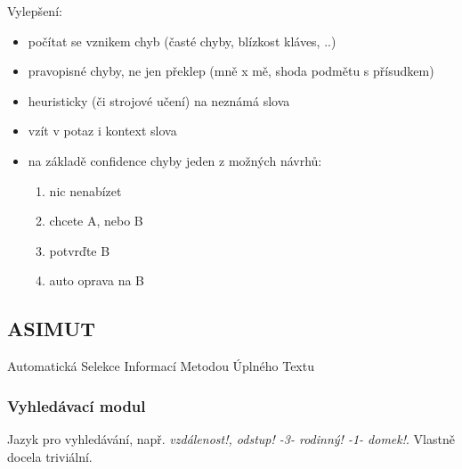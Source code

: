 \documentclass[a4paper]{article}
\begin{document}
Vylepšení:
\begin{itemize}
\item počítat se vznikem chyb (časté chyby, blízkost kláves, ..)
\item pravopisné chyby, ne jen překlep (mně x mě, shoda podmětu s přísudkem)
\item heuristicky (či strojové učení) na neznámá slova
\item vzít v potaz i kontext slova
\item na základě confidence chyby jeden z možných návrhů:
\begin{enumerate}
	\item nic nenabízet
	\item chcete A, nebo B
	\item potvrďte B
	\item auto oprava na B
\end{enumerate}
\end{itemize}

\subsection*{ASIMUT}
Automatická Selekce Informací Metodou Úplného Textu

\subsubsection*{Vyhledávací modul} 
Jazyk pro vyhledávání, např. \textit{vzdálenost!, odstup! -3- rodinný! -1- domek!}. Vlastně docela triviální.
\end{document}
